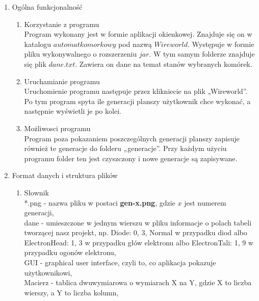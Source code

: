 \documentclass[11pt]{article}
\begin{document}
\begin{enumerate}
 
 
\item Ogólna funkcjonalność

\begin{enumerate}[label=\arabic{enumi}.\arabic*.]
 \item  Korzystanie z programu
 \\Program wykonany jest w formie aplikacji okienkowej. Znajduje się on w katalogu $automat komorkowy$ pod nazwą $Wireworld$. Występuje w formie pliku wykonywalnego o rozszerzeniu $jar.$ W tym samym folderze znajduje się plik $dane.txt$. Zawiera on dane na temat stanów wybranych komórek.\\
\item  Uruchamianie programu
\\Uruchomienie programu następuje przez klikniecie na plik „Wireworld”. Po tym program spyta ile generacji planszy użytkownik chce wykonać, a następnie wyświetli je po kolei.\\
\item Możliwosci programu
\\Program poza pokazaniem poszczególnych generacji planszy zapisuje również te generacje do folderu „generacje”. Przy każdym użyciu programu folder ten jest czyszczony i nowe generacje są zapisywane.\\
\end{enumerate}
 
  \item Format danych i struktura plików
  
  \begin{enumerate}[label=\arabic{enumi}.\arabic*.]
  
 \item Słownik\\
 *.png - nazwa pliku w postaci \textbf{gen-x.png}, gdzie $x$ jest numerem generacji,\\
 
 dane - umieszczone w jednym wierszu w pliku informacje o polach tabeli tworzącej nasz projekt, np. Diode: 0, 3, Normal w przypadku diod albo ElectronHead: 1, 3 w przypadku głów elektronu albo ElectronTali: 1, 9 w przypadku ogonów elektronu,\\
 
 GUI - graphical user interface, czyli to, co aplikacja pokazuje użytkownikowi,\\
 
 Macierz - tablica dwuwymiarowa o wymiarach X na Y, gdzie X to liczba wierszy, a Y to liczba kolumn,\\
 

\end{enumerate}
\end{enumerate}
\end{document}
